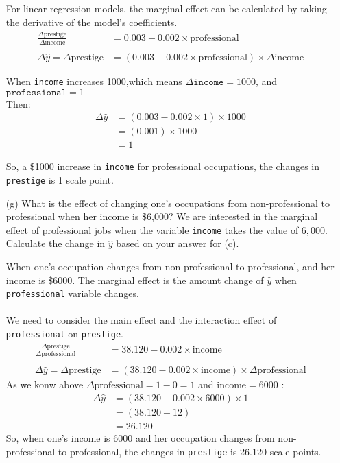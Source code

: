 \documentclass[12pt,letterpaper]{article}
\begin{document}
\begin{enumerate}
	\vspace{.10cm}
	
	\noindent For linear regression models, the marginal effect can be calculated by taking the derivative of the model's coefficients. 
	\begin{align*}
		\frac{\Delta \text{prestige}}{\Delta \text{income}} &= 0.003 - 0.002 \times \text{professional} \\\\
		\Delta \hat{y} = \Delta \text{prestige} &= (0.003 - 0.002 \times \text{professional}) \times \Delta \text{income}
	\end{align*}
	
	\noindent When \texttt{income} increases 1000,which means \(\Delta \texttt{income} = 1000\), and \(\texttt{professional} = 1\) \\Then:
	\begin{align*}
		\Delta \hat{y} &= (0.003 - 0.002 \times 1) \times 1000 \\
		&= (0.001) \times 1000 \\
		&= 1
	\end{align*}
	
	\noindent So, a \$1000 increase in \texttt{income} for professional occupations, the changes in  \texttt{prestige} is 1 scale point.
	
	\item [(g)]
	What is the effect of changing one's occupations from non-professional to professional when her income is \$6,000? We are interested in the marginal effect of professional jobs when the variable \texttt{income} takes the value of $6,000$. Calculate the change in $\hat{y}$ based on your answer for (c).
	
	\noindent When one's occupation changes from non-professional to professional, and her income is \$6000. The marginal effect is the amount change of $\hat{y}$ when \texttt{professional} variable changes.\\\\ We need to consider the main effect and the interaction effect of \texttt{professional} on \texttt{prestige}.
	\begin{align*}
		\frac{\Delta \text{prestige}}{\Delta \text{professional}} &= 38.120 - 0.002 \times \text{income} \\\\
		\Delta \hat{y} = \Delta \text{prestige} &=  (38.120 - 0.002 \times \text{income})\times \Delta \text{professional}
	\end{align*}
	\noindent As we konw above \(\Delta \text{professional}=1-0=1\) and \(\text{income}=6000\) :
	\begin{align*}
		\Delta \hat{y} &= (38.120 - 0.002 \times 6000) \times 1 \\
		&= (38.120 - 12) \\
		&= 26.120
	\end{align*}
	\noindent So, when one's income is 6000 and her occupation changes from non-professional to professional, the changes in \texttt{prestige} is 26.120 scale points. 
\end{enumerate}
\end{document}
